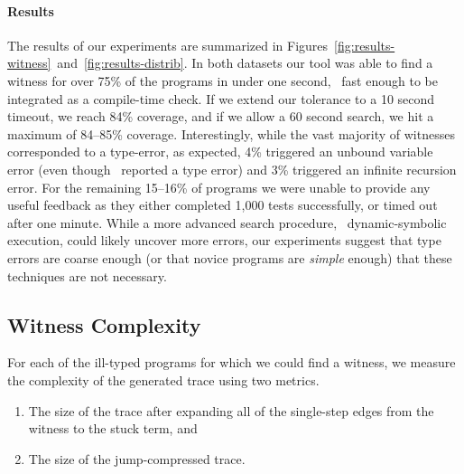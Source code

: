 \paragraph{Results}
\label{sec:results-witness}
The results of our experiments are summarized in
Figures~\ref{fig:results-witness}~and~\ref{fig:results-distrib}.
%
In both datasets our tool was able to find a witness for over 75\% of the
programs in under one second, \ie\ fast enough to be integrated as a
compile-time check. If we extend our tolerance to a 10 second timeout,
we reach 84\% coverage, and if we allow a 60 second search,
we hit a maximum of 84--85\% coverage.
%
Interestingly, while the vast majority of witnesses corresponded to a
type-error, as expected, 4\% triggered an unbound variable error (even
though \ocaml\ reported a type error) and 3\% triggered an infinite
recursion error.
%
For the remaining 15--16\% of programs we were unable to provide any useful
feedback as they either completed 1,000 tests successfully, or timed out
after one minute.
%
%
While a more advanced search procedure, \eg\ dynamic-symbolic execution,
could likely uncover more errors, our experiments suggest that
type errors are coarse enough (or that novice programs are \emph{simple}
enough) that these techniques are not necessary.




\subsection{Witness Complexity}
\label{sec:trace-complexity}

For each of the ill-typed programs for which we could
find a witness, we measure the complexity of the generated
trace using two metrics.

%
\begin{enumerate}
\item {} The size of the trace after expanding
  all of the single-step edges from the witness to the stuck term, and
\item {} The size of the jump-compressed trace.
\end{enumerate}


